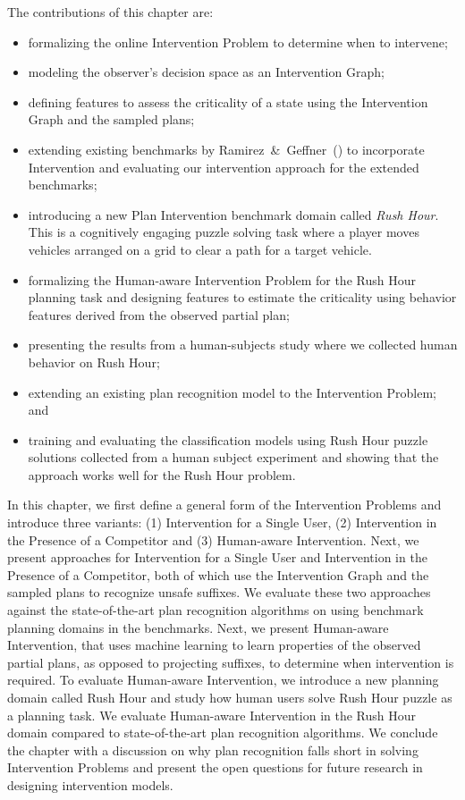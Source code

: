 The contributions of this chapter are:
\begin{itemize}
\item formalizing the online Intervention Problem to determine when to intervene;
\item modeling the observer's decision space as an Intervention Graph;
\item defining features to assess the criticality of a state using the Intervention Graph and the sampled plans;
\item extending existing benchmarks by Ramirez~\&~Geffner~(\citeyear{ramirez2009plan, ramirez2010probabilistic}) to incorporate Intervention and  evaluating our intervention approach for the extended benchmarks;
\item introducing a new Plan Intervention benchmark domain called \emph{Rush Hour}. This is a cognitively engaging puzzle solving task where a player moves vehicles arranged on a grid to clear a path for a target vehicle. 
\item formalizing the Human-aware Intervention Problem for the Rush Hour planning task and designing features to estimate the criticality using behavior features derived from the observed partial plan;
\item presenting the results from a human-subjects study where we collected human behavior on Rush Hour;
\item extending an existing plan recognition model to the Intervention Problem; and
\item training and evaluating the classification models using Rush Hour puzzle solutions collected from a human subject experiment and showing that the approach works well for the Rush Hour problem.
\end{itemize}

In this chapter, we first define a general form of the Intervention Problems and introduce three variants: (1) Intervention for a Single User, (2) Intervention in the Presence of a Competitor and (3) Human-aware Intervention. Next, we present approaches for Intervention for a Single User and Intervention in the Presence of a Competitor, both of which use the Intervention Graph and the sampled plans to recognize unsafe suffixes. We evaluate these two approaches against the state-of-the-art plan recognition algorithms on using benchmark planning domains in the benchmarks. Next, we present Human-aware Intervention, that uses machine learning to learn properties of the observed partial plans, as opposed to projecting suffixes, to determine when intervention is required. To evaluate Human-aware Intervention, we introduce a new planning domain called Rush Hour and study how human users solve Rush Hour puzzle as a planning task. We evaluate Human-aware Intervention in the Rush Hour domain compared to state-of-the-art plan recognition algorithms. We conclude the chapter with a discussion on why plan recognition falls short in solving Intervention Problems and present the open questions for future research in designing intervention models.


